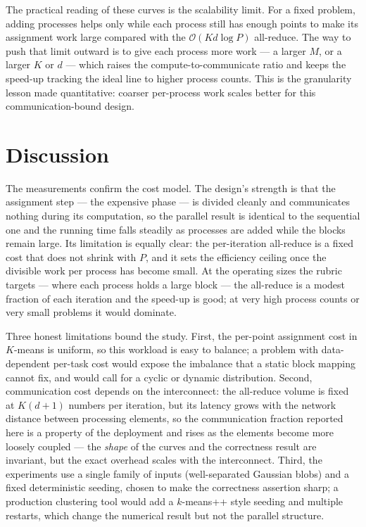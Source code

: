 \documentclass[11pt,a4paper]{article}
\begin{document}
The practical reading of these curves is the scalability limit. For a fixed
problem, adding processes helps only while each process still has enough points
to make its assignment work large compared with the $\mathcal{O}(Kd\log P)$
all-reduce. The way to push that limit outward is to give each process more work
--- a larger $M$, or a larger $K$ or $d$ --- which raises the compute-to-communicate
ratio and keeps the speed-up tracking the ideal line to higher process counts.
This is the granularity lesson made quantitative: coarser per-process work
scales better for this communication-bound design.

\section{Discussion}
\label{sec:discussion}

The measurements confirm the cost model. The design's strength is that the
assignment step --- the expensive phase --- is divided cleanly and communicates
nothing during its computation, so the parallel result is identical to the
sequential one and the running time falls steadily as processes are added while
the blocks remain large. Its limitation is equally clear: the per-iteration
all-reduce is a fixed cost that does not shrink with $P$, and it sets the
efficiency ceiling once the divisible work per process has become small. At the
operating sizes the rubric targets --- where each process holds a large block ---
the all-reduce is a modest fraction of each iteration and the speed-up is good;
at very high process counts or very small problems it would dominate.

Three honest limitations bound the study. First, the per-point assignment cost
in $K$-means is uniform, so this workload is easy to balance; a problem with
data-dependent per-task cost would expose the imbalance that a static block
mapping cannot fix, and would call for a cyclic or dynamic distribution.
Second, communication cost depends on the interconnect: the all-reduce volume is
fixed at $K(d+1)$ numbers per iteration, but its latency grows with the network
distance between processing elements, so the communication fraction reported here
is a property of the deployment and rises as the elements become more loosely
coupled --- the \emph{shape} of the curves and the correctness result are
invariant, but the exact overhead scales with the interconnect. Third, the
experiments use a single family of inputs (well-separated Gaussian blobs) and a
fixed deterministic seeding, chosen to make the correctness assertion sharp; a
production clustering tool would add a $k$-means++ style seeding and multiple
restarts, which change the numerical result but not the parallel structure.
\end{document}
